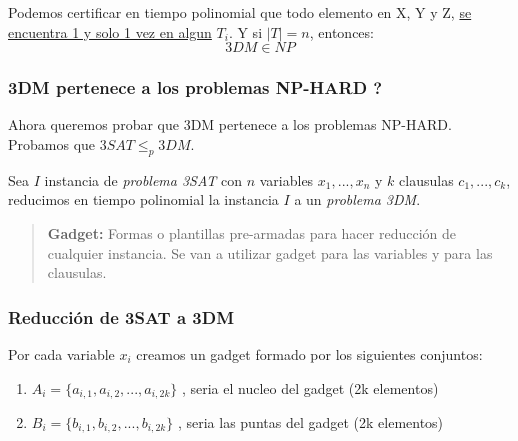 \documentclass{article}
\begin{document}
Podemos certificar en tiempo polinomial que todo elemento en X, Y y Z, \underline{se encuentra 1 
y solo 1 vez en algun} \(T_i\). Y si \(|T|=n\), entonces:
\[
    3DM \in NP
\] 

\subsubsection{3DM pertenece a los problemas NP-HARD ?}

Ahora queremos probar que 3DM pertenece a los problemas NP-HARD. Probamos que \(3SAT \leq_p 3DM\).

Sea \(I\) instancia de \textit{problema 3SAT} con \(n\) variables \(x_1,...,x_n\) y \(k\) clausulas \(c_1,...,c_k\), 
reducimos en tiempo polinomial la instancia \(I\) a un \textit{problema 3DM}.

\begin{quote}
    \textbf{Gadget:} Formas o plantillas pre-armadas para hacer reducción de cualquier instancia. 
    Se van a utilizar gadget para las variables y para las clausulas.
\end{quote}

\subsubsection{Reducción de 3SAT a 3DM}

Por cada variable \(x_i\) creamos un gadget formado por los siguientes conjuntos:
\begin{enumerate}
    \item \(A_i=\{a_{i,1},a_{i,2},...,a_{i,2k}\}\) , seria el nucleo del gadget (2k elementos)
    \item \(B_i=\{b_{i,1},b_{i,2},...,b_{i,2k}\}\) , seria las puntas del gadget (2k elementos)
\end{enumerate}
\end{document}
